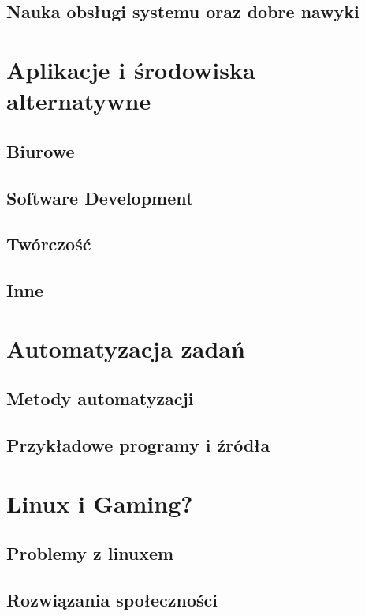 \documentclass[10pt,a4paper]{report}
\begin{document}
	\section{Nauka obsługi systemu oraz dobre nawyki}
	
\chapter{Aplikacje i środowiska alternatywne}

	\section{Biurowe}
	
	\section{Software Development}
	
	\section{Twórczość}
	
	\section{Inne}
	
\chapter{Automatyzacja zadań}

	\section{Metody automatyzacji}
	
	\section{Przykładowe programy i źródła}
	
\chapter{Linux i Gaming?}

	\section{Problemy z linuxem}
	
	\section{Rozwiązania społeczności}
	
\end{document}

